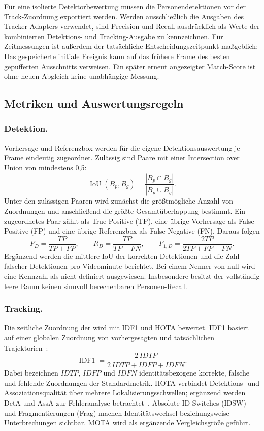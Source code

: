 \documentclass[runningheads]{llncs}
\begin{document}
Für eine isolierte Detektorbewertung müssen die Personendetektionen vor der Track-Zuordnung exportiert werden. Werden ausschließlich die Ausgaben des Tracker-Adapters verwendet, sind Precision und Recall ausdrücklich als Werte der kombinierten Detektions- und Tracking-Ausgabe zu kennzeichnen. Für Zeitmessungen ist außerdem der tatsächliche Entscheidungszeitpunkt maßgeblich: Das gespeicherte initiale Ereignis kann auf das frühere Frame des besten gepufferten Ausschnitts verweisen. Ein später erneut angezeigter Match-Score ist ohne neuen Abgleich keine unabhängige Messung.

\subsection{Metriken und Auswertungsregeln}

\subsubsection{Detektion.}
Vorhersage und Referenzbox werden für die eigene Detektionsauswertung je Frame eindeutig zugeordnet. Zulässig sind Paare mit einer Intersection over Union von mindestens 0,5:
\begin{equation}
\operatorname{IoU}(B_p,B_g)=
\frac{|B_p\cap B_g|}{|B_p\cup B_g|}.
\label{eq:eval-iou}
\end{equation}
Unter den zulässigen Paaren wird zunächst die größtmögliche Anzahl von Zuordnungen und anschließend die größte Gesamtüberlappung bestimmt. Ein zugeordnetes Paar zählt als True Positive (TP), eine übrige Vorhersage als False Positive (FP) und eine übrige Referenzbox als False Negative (FN). Daraus folgen
\begin{equation}
P_D=\frac{TP}{TP+FP},\qquad
R_D=\frac{TP}{TP+FN},\qquad
F_{1,D}=\frac{2TP}{2TP+FP+FN}.
\label{eq:eval-detection}
\end{equation}
Ergänzend werden die mittlere IoU der korrekten Detektionen und die Zahl falscher Detektionen pro Videominute berichtet. Bei einem Nenner von null wird eine Kennzahl als nicht definiert ausgewiesen. Insbesondere besitzt der vollständig leere Raum keinen sinnvoll berechenbaren Personen-Recall.

\subsubsection{Tracking.}
Die zeitliche Zuordnung der  wird mit IDF1 und HOTA bewertet. IDF1 basiert auf einer globalen Zuordnung von vorhergesagten und tatsächlichen Trajektorien~\cite{ristani2016identity}:
\begin{equation}
\operatorname{IDF1}=
\frac{2\,IDTP}{2\,IDTP+IDFP+IDFN}.
\label{eq:eval-idf1}
\end{equation}
Dabei bezeichnen $IDTP$, $IDFP$ und $IDFN$ identitätsbezogene korrekte, falsche und fehlende Zuordnungen der Standardmetrik. HOTA verbindet Detektions- und Assoziationsqualität über mehrere Lokalisierungsschwellen; ergänzend werden DetA und AssA zur Fehleranalyse betrachtet~\cite{luiten2021hota}. Absolute ID-Switches (IDSW) und Fragmentierungen (Frag) machen Identitätswechsel beziehungsweise Unterbrechungen sichtbar. MOTA wird als ergänzende Vergleichsgröße geführt.
\end{document}
